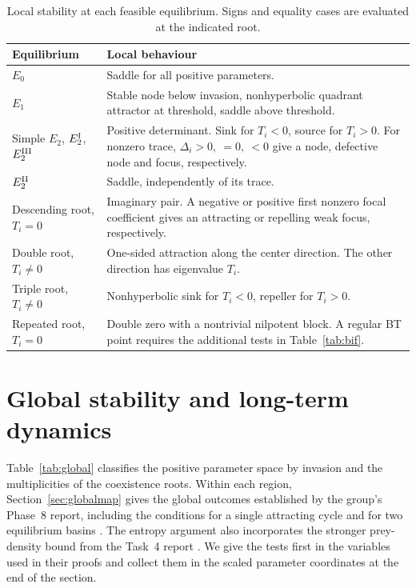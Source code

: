 \documentclass[12pt,a4paper,twoside,fleqn]{article}
\theoremstyle{journal}
\begin{document}
\begin{table}[H]\centering
\caption{Local stability at each feasible equilibrium. Signs and equality cases are evaluated at the indicated root.}
\label{tab:stability}
\begin{tabularx}{\linewidth}{@{}lY@{}}\toprule
Equilibrium & Local behaviour \\ \midrule
\(E_0\) & Saddle for all positive parameters.\\
\(E_1\) & Stable node below invasion, nonhyperbolic quadrant attractor at threshold, saddle above threshold.\\
Simple \(E_2\), \(E_2^{\rm I}\), \(E_2^{\rm III}\) & Positive determinant. Sink for \(T_i<0\), source for \(T_i>0\). For nonzero trace, \(\Delta_i>0,\ =0,\ <0\) give a node, defective node and focus, respectively.\\
\(E_2^{\rm II}\) & Saddle, independently of its trace.\\
Descending root, \(T_i=0\) & Imaginary pair. A negative or positive first nonzero focal coefficient gives an attracting or repelling weak focus, respectively.\\
Double root, \(T_i\ne0\) & One-sided attraction along the center direction. The other direction has eigenvalue \(T_i\).\\
Triple root, \(T_i\ne0\) & Nonhyperbolic sink for \(T_i<0\), repeller for \(T_i>0\).\\
Repeated root, \(T_i=0\) & Double zero with a nontrivial nilpotent block. A regular BT point requires the additional tests in Table~\ref{tab:bif}.\\
\bottomrule
\end{tabularx}
\end{table}

\section{Global stability and long-term dynamics}\label{sec:global}
Table~\ref{tab:global} classifies the positive parameter space by invasion and the multiplicities of the coexistence roots. Within each region, Section~\ref{sec:globalmap} gives the global outcomes established by the group's Phase~8 report, including the conditions for a single attracting cycle and for two equilibrium basins \citep[Theorems G3--G4, G6--G10, P8-U1, P8-U3/U6 and P8-B1/B2]{phase8}. The entropy argument also incorporates the stronger prey-density bound from the Task~4 report \citep[Section~4]{taskfour}. We give the tests first in the variables used in their proofs and collect them in the scaled parameter coordinates at the end of the section.
\end{document}
